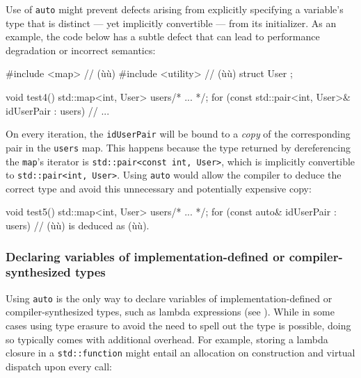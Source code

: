 Use of \lstinline!auto! might prevent defects arising from explicitly
specifying a variable's type that is distinct --- yet implicitly
convertible --- from its initializer. As an example, the code below has
a subtle defect that can lead to performance degradation or incorrect
semantics:

\begin{emcppshiddenlisting}[emcppsbatch={e6,e7}]
#include <map>      // (ù{}ù)
#include <utility>  // (ù{}ù)
struct User {};
\end{emcppshiddenlisting}
\begin{emcppslisting}[emcppsbatch=e6]
void test4()
{
    std::map<int, User> users{/* ... */};
    for (const std::pair<int, User>& idUserPair : users)
    {
        // ...
    }
}
\end{emcppslisting}
    
\noindent On every iteration, the \lstinline!idUserPair! will be bound to a
\emph{copy} of the corresponding pair in the \lstinline!users! map. This
happens because the type returned by dereferencing the \lstinline!map!'s
iterator is \lstinline!std::pair<const!~\lstinline!int,!~\lstinline!User>!, which
is implicitly convertible to \lstinline!std::pair<int,!~\lstinline!User>!.
Using \lstinline!auto! would allow the compiler to deduce the correct type
and avoid this unnecessary and potentially expensive copy:

\begin{emcppslisting}[emcppsbatch=e7]
void test5()
{
    std::map<int, User> users{/* ... */};
    for (const auto& idUserPair : users)
    {
        // (ù{}ù) is deduced as (ù{}ù).
    }
}
\end{emcppslisting}
    

\subsubsection[Declaring variables of implementation-defined or compiler-synthesized types]{Declaring variables of implementation-defined or compiler-synthesized types}\label{declaring-variables-of-implementation-defined-or-compiler-synthesized-types}

Using \lstinline!auto! is the only way to declare variables of
implementation-defined or compiler-synthesized types, such as
lambda expressions (see ). While in some cases 
using type erasure to avoid the need to spell out the type is possible, doing so typically
comes with additional overhead. For example, storing a lambda closure in
a \lstinline!std::function! might entail an allocation on construction and
virtual dispatch upon every call:

